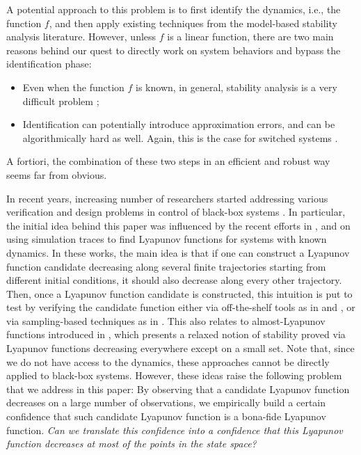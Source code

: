 A potential approach to this problem is to first identify the dynamics, i.e., the function $f$, and then apply existing techniques from the model-based stability analysis literature. However, unless $f$ is a linear function, there are two main reasons behind our quest to directly work on system behaviors and bypass the identification phase: 
\begin{itemize}
\item Even when the function $f$ is known, in general, stability analysis is a very difficult problem \cite{stabilityHard1}; 
\item Identification can potentially introduce approximation errors, and can be algorithmically hard as well. Again, this is the case for switched systems \cite{lauer}. 
\end{itemize}

A fortiori, the combination of these two steps in an efficient and robust way seems far from obvious.

In recent years, increasing number of researchers started addressing various verification and design problems in control of black-box systems \cite{bianchini, balkan, mitra, mitra2}. In particular, the initial idea behind this paper was influenced by the recent efforts in \cite{topcu, kapinski}, and \cite{lazar} on using simulation traces to find Lyapunov functions for systems with known dynamics. In these works, the main idea is that if one can construct a Lyapunov function candidate decreasing along several finite trajectories starting from different initial conditions, it should also decrease along every other trajectory. Then, once a Lyapunov function candidate is constructed, this intuition is put to test by verifying the candidate function either via off-the-shelf tools as in \cite{topcu} and \cite{kapinski}, or via sampling-based techniques as in \cite{lazar}. This also relates to almost-Lyapunov functions introduced in \cite{liberzon}, which presents a relaxed notion of stability proved via Lyapunov functions decreasing everywhere except on a small set. Note that, since we do not have access to the dynamics, these approaches cannot be directly applied to black-box systems. However, these ideas raise the following problem that we address in this paper: By observing that a candidate Lyapunov function decreases on a large number of observations, we empirically build a certain confidence that such candidate Lyapunov function is a bona-fide Lyapunov function. \emph{Can we translate this confidence into a confidence that this Lyapunov function decreases at most of the points in the state space?} 

